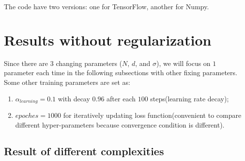 \documentclass[12pt,letterpaper]{article}
\begin{document}
The code have two versions: one for TensorFlow, another for Numpy.

\section{Results without regularization}

Since there are $3$ changing parameters ($N$, $d$, and $\sigma$), we will focus on $1$ parameter each time in the following subsections with other fixing parameters. Some other training parameters are set as:
\begin{enumerate}
    \item $\alpha_{learning} = 0.1$ with decay $0.96$ after each $100$ steps(learning rate decay);
    \item $epoches = 1000$ for iteratively updating loss function(convenient to compare different hyper-parameters because convergence condition is different).
\end{enumerate}

\subsection{Result of different complexities}
\end{document}
